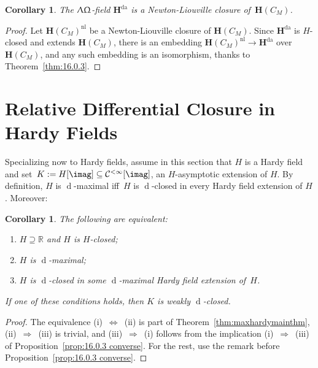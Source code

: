 \documentclass[]{amsart}
\numberwithin{equation}{section}
\newcommand{\bbold}{\mathbb}
\def\R { {\bbold R} }
\def \d{\operatorname{d}}
\newtheorem{cor}[theorem]{Corollary}
\theoremstyle{definition}
\theoremstyle{remark}
\def \Upl{\Uplambda}
\def \Upo{\Upomega}
\def\HLO{\Upl\Upo}
\def \Calinf{\mathcal{C}^{<\infty}}
\begin{document}
\begin{cor}\label{cor:nlc, 2}  
The $\HLO$-field $\boldsymbol H^{\operatorname{da}}$ is a New\-ton-Liouville closure of~$\boldsymbol H(C_M)$.
\end{cor}
\begin{proof}
Let $\boldsymbol H(C_M)^{\operatorname{nl}}$ be a  Newton-Liouville closure of $\boldsymbol H(C_M)$.
Since $\boldsymbol H^{\operatorname{da}}$   is $H$-closed and extends $\boldsymbol H(C_M)$,  there is an embedding $\boldsymbol H(C_M)^{\operatorname{nl}}\to \boldsymbol H^{\operatorname{da}}$ over $\boldsymbol H(C_M)$, and any such embedding is an isomorphism, thanks to  Theorem~\ref{thm:16.0.3}.
\end{proof}



\section{Relative Differential Closure in Hardy Fields}\label{sec:d-cl hardy}

\noindent
Specializing now to Hardy fields, assume in this section that
$H$ is a Hardy field and set~$K:=H[\imag]\subseteq \Calinf[\imag]$, an $H$-asymptotic extension of $H$. 
By definition, $H$ is $\d$-maximal iff~$H$ is $\d$-closed in every Hardy field extension of $H$. Moreover:

\begin{cor}\label{cor:char d-max}
The following are equivalent:
\begin{enumerate}
\item[\textup{(i)}] $H\supseteq \R$ and $H$ is $H$-closed;
\item[\textup{(ii)}] $H$ is $\d$-maximal;
\item[\textup{(iii)}] $H$ is $\d$-closed in some  $\d$-maximal Hardy field extension of~$H$.
\end{enumerate}
If one of these conditions holds, then $K$ is weakly $\d$-closed.
\end{cor}
\begin{proof}
The equivalence (i)~$\Leftrightarrow$~(ii) is part of Theorem~\ref{thm:maxhardymainthm}, (ii)~$\Rightarrow$~(iii) is trivial, and (iii)~$\Rightarrow$~(i) follows from the implication (i)~$\Rightarrow$~(iii) of
Proposition~\ref{prop:16.0.3 converse}. For the rest, use the remark before Proposition~\ref{prop:16.0.3 converse}.
\end{proof}
\end{document}
